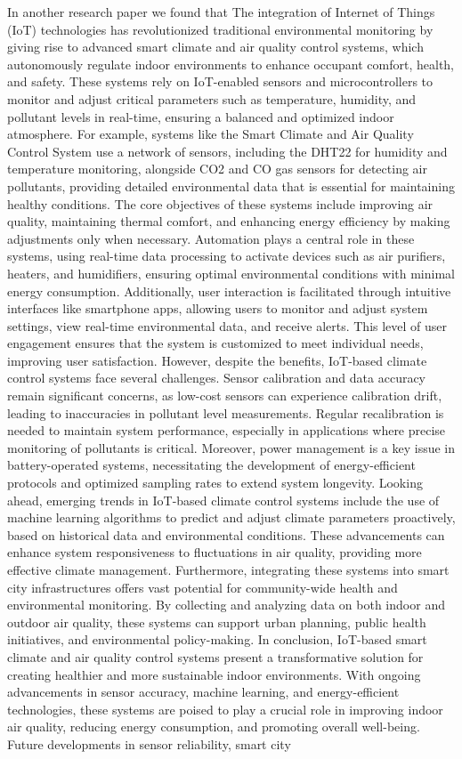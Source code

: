 \documentclass[USenglish,oneside,twocolumn]{article}
\begin{document}
In another research paper we found that The integration of Internet of Things (IoT) technologies has revolutionized traditional environmental monitoring by giving rise to advanced smart climate and air quality control systems, which autonomously regulate indoor environments to enhance occupant comfort, health, and safety. These systems rely on IoT-enabled sensors and microcontrollers to monitor and adjust critical parameters such as temperature, humidity, and pollutant levels in real-time, ensuring a balanced and optimized indoor atmosphere. For example, systems like the Smart Climate and Air Quality Control System use a network of sensors, including the DHT22 for humidity and temperature monitoring, alongside CO2 and CO gas sensors for detecting air pollutants, providing detailed environmental data that is essential for maintaining healthy conditions. The core objectives of these systems include improving air quality, maintaining thermal comfort, and enhancing energy efficiency by making adjustments only when necessary. Automation plays a central role in these systems, using real-time data processing to activate devices such as air purifiers, heaters, and humidifiers, ensuring optimal environmental conditions with minimal energy consumption. Additionally, user interaction is facilitated through intuitive interfaces like smartphone apps, allowing users to monitor and adjust system settings, view real-time environmental data, and receive alerts. This level of user engagement ensures that the system is customized to meet individual needs, improving user satisfaction. However, despite the benefits, IoT-based climate control systems face several challenges. Sensor calibration and data accuracy remain significant concerns, as low-cost sensors can experience calibration drift, leading to inaccuracies in pollutant level measurements. Regular recalibration is needed to maintain system performance, especially in applications where precise monitoring of pollutants is critical. Moreover, power management is a key issue in battery-operated systems, necessitating the development of energy-efficient protocols and optimized sampling rates to extend system longevity. Looking ahead, emerging trends in IoT-based climate control systems include the use of machine learning algorithms to predict and adjust climate parameters proactively, based on historical data and environmental conditions. These advancements can enhance system responsiveness to fluctuations in air quality, providing more effective climate management. Furthermore, integrating these systems into smart city infrastructures offers vast potential for community-wide health and environmental monitoring. By collecting and analyzing data on both indoor and outdoor air quality, these systems can support urban planning, public health initiatives, and environmental policy-making. In conclusion, IoT-based smart climate and air quality control systems present a transformative solution for creating healthier and more sustainable indoor environments. With ongoing advancements in sensor accuracy, machine learning, and energy-efficient technologies, these systems are poised to play a crucial role in improving indoor air quality, reducing energy consumption, and promoting overall well-being. Future developments in sensor reliability, smart city 
\end{document}

